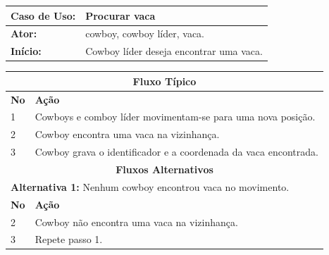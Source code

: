 \documentclass{llncs}
\begin{document}
\begin{center}
\begin{tabular}{|p{2.5cm}|p{10cm}|}
\hline
\rowcolor[gray]{0.8} \textbf{Caso de Uso:}	&\textbf{Procurar vaca} \\
\hline
\textbf{Ator:} 			&cowboy, cowboy líder, vaca. \\
\hline
\textbf{Início:}		&Cowboy líder deseja encontrar uma vaca. \\
\hline
\end{tabular}
\begin{tabular}{|p{0.5cm}|p{12cm}|}
\hline
\multicolumn{2}{|c|}{\textbf{Fluxo Típico}} \\
\hline
\textbf{No}	&\textbf{Ação} \\
\hline
1	&Cowboys e comboy líder movimentam-se para uma nova posição. \\
\hline
2	&Cowboy encontra uma vaca na vizinhança. \\
\hline
3	&Cowboy grava o identificador e a coordenada da vaca encontrada. \\
\hline
\multicolumn{2}{|c|}{\textbf{Fluxos Alternativos}} \\
\hline
\multicolumn{2}{|l|}{\textbf{Alternativa 1:} Nenhum cowboy encontrou vaca no movimento.} \\
\hline
\textbf{No}	&\textbf{Ação} \\
\hline
2	&Cowboy não encontra uma vaca na vizinhança. \\
\hline
3	&Repete passo 1. \\
\hline
\end{tabular}
\end{center}
\end{document}
